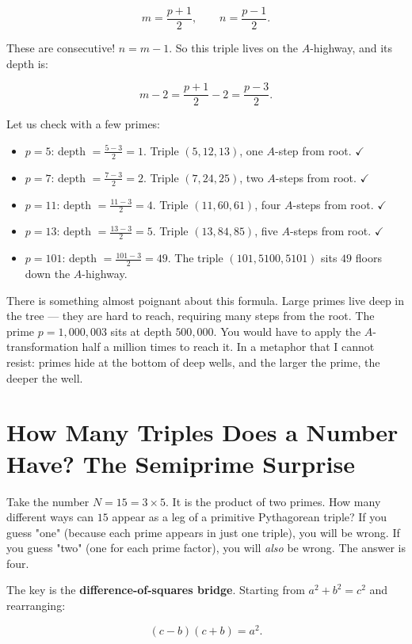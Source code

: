 \documentclass[11pt,twoside,openright]{book}
\theoremstyle{definition}
\theoremstyle{remark}
\begin{document}
\[m = \frac{p + 1}{2}, \qquad n = \frac{p - 1}{2}.\]

These are consecutive! $n = m - 1$. So this triple lives on the $A$-highway, and its depth is:

\[m - 2 = \frac{p + 1}{2} - 2 = \frac{p - 3}{2}.\]

Let us check with a few primes:

\begin{itemize}
  \item $p = 5$: depth $= \frac{5-3}{2} = 1$. Triple $(5, 12, 13)$, one $A$-step from root. $\checkmark$
  \item $p = 7$: depth $= \frac{7-3}{2} = 2$. Triple $(7, 24, 25)$, two $A$-steps from root. $\checkmark$
  \item $p = 11$: depth $= \frac{11-3}{2} = 4$. Triple $(11, 60, 61)$, four $A$-steps from root. $\checkmark$
  \item $p = 13$: depth $= \frac{13-3}{2} = 5$. Triple $(13, 84, 85)$, five $A$-steps from root. $\checkmark$
  \item $p = 101$: depth $= \frac{101-3}{2} = 49$. The triple $(101, 5100, 5101)$ sits $49$ floors down the $A$-highway.
\end{itemize}

There is something almost poignant about this formula. Large primes live deep in the tree --- they are hard to reach, requiring many steps from the root. The prime $p = 1{,}000{,}003$ sits at depth $500{,}000$. You would have to apply the $A$-transformation half a million times to reach it. In a metaphor that I cannot resist: primes hide at the bottom of deep wells, and the larger the prime, the deeper the well.



\section{How Many Triples Does a Number Have? The Semiprime Surprise}

Take the number $N = 15 = 3 \times 5$. It is the product of two primes. How many different ways can $15$ appear as a leg of a primitive Pythagorean triple? If you guess "one" (because each prime appears in just one triple), you will be wrong. If you guess "two" (one for each prime factor), you will \textit{also} be wrong. The answer is four.

The key is the \textbf{difference-of-squares bridge}. Starting from $a^2 + b^2 = c^2$ and rearranging:

\[(c - b)(c + b) = a^2.\]
\end{document}
